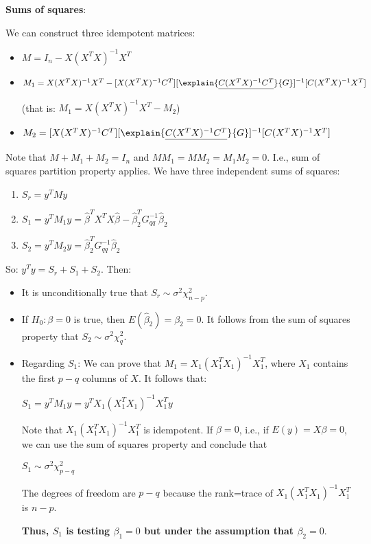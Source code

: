 \textbf{Sums of squares}:

We can construct three idempotent matrices:

\begin{itemize}
\item
$M = I_n - X(X^T X)^{-1} X^T$
\item
$M_1 =  X(X^T X)^{-1} X^T -   [X(X^T X)^{-1} C^T]  [\explain{\underline{C (X^T X)^{-1} C^T}}{G}]^{-1}  
[C(X^T X)^{-1} X^T]$

(that is: $M_1 =  X(X^T X)^{-1} X^T - M_2$)

\item $M_2 = [X(X^T X)^{-1} C^T]  [\explain{\underline{C (X^T X)^{-1} C^T}}{G}]^{-1}  
[C(X^T X)^{-1} X^T]$
\end{itemize}

Note that $M+M_1+M_2=I_n$ and $MM_1=MM_2=M_1M_2=0$. I.e., sum of squares partition property applies. We have three independent sums of squares:

\begin{enumerate}
\item $S_r = y^T M y$
\item $S_1 = y^T M_1 y = \hat{\beta}^T X^T X \hat{\beta}-  \hat{\beta}_2^T G_{qq}^{-1} \hat{\beta}_2$
\item $S_2 = y^T M_2 y =  \hat{\beta}_2^T G_{qq}^{-1} \hat{\beta}_2$
\end{enumerate}

So: $y^T y = S_r + S_1 + S_2$.  Then:

\begin{itemize}
\item It is unconditionally true that $S_r \sim \sigma^2 \chi^2_{n-p}$.
\item If $H_0: \beta=0$ is true, then $E(\hat{\beta}_2) = \beta_2 = 0$. It follows from the sum of squares property that $S_2 \sim \sigma^2 \chi_q^2$.  
\item Regarding $S_1$: 
We can prove that $M_1 = X_1 (X_1^T X_1)^{-1}X_1^T$, where $X_1$ contains the first $p-q$ columns of $X$. It follows that:

$S_1 = y^T M_1 y =y^T X_1 (X_1^T X_1)^{-1}X_1^T  y$

Note that $X_1 (X_1^T X_1)^{-1}X_1^T$ is idempotent. If $\beta=0$, i.e., if $E(y) =X\beta = 0$, we can use the  sum of squares property and conclude that

$S_1 \sim \sigma^2 \chi_{p-q}^2$

The degrees of freedom are $p-q$ because the rank=trace of  $X_1 (X_1^T X_1)^{-1}X_1^T$ is $n-p$.

\textbf{Thus, $S_1$ is testing $\beta_1=0$ but under the assumption that $\beta_2=0$}.

\end{itemize}

